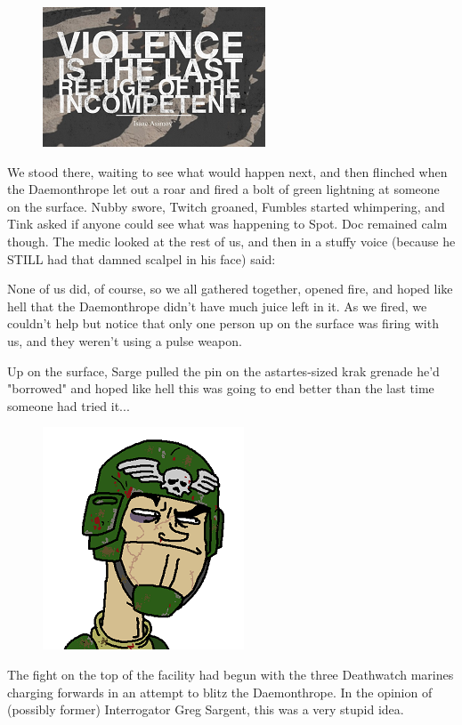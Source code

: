 \begin{figure}
	\begin{center}
		\includegraphics[width=\figwidth]{pics/16/43.png}
	\end{center}
\end{figure}
We stood there, waiting to see what would happen next, and then flinched when the Daemonthrope let out a roar and fired a bolt of green lightning at someone on the surface. 
Nubby swore, Twitch groaned, Fumbles started whimpering, and Tink asked if anyone could see what was happening to Spot. 
Doc remained calm though. 
The medic looked at the rest of us, and then in a stuffy voice (because he STILL had that damned scalpel in his face) said:



None of us did, of course, so we all gathered together, opened fire, and hoped like hell that the Daemonthrope didn't have much juice left in it. 
As we fired, we couldn't help but notice that only one person up on the surface was firing with us, and they weren't using a pulse weapon.

Up on the surface, Sarge pulled the pin on the astartes-sized krak grenade he'd "borrowed" and hoped like hell this was going to end better than the last time someone had tried it...

\begin{figure}
	\begin{center}
		\includegraphics[width=\figwidth]{pics/16/44.png}
	\end{center}
\end{figure}
The fight on the top of the facility had begun with the three Deathwatch marines charging forwards in an attempt to blitz the Daemonthrope. 
In the opinion of (possibly former) Interrogator Greg Sargent, this was a very stupid idea.

